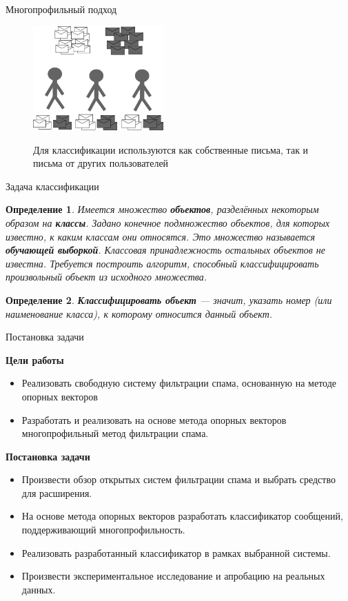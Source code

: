 \documentclass{beamer}
\newtheorem{define}{Определение}
\begin{document}
\begin{frame}{Многопрофильный подход}
\begin{figure}[h]
\begin{center}
    \includegraphics[width=5cm]{img/multiprofile}
\end{center}
    Для классификации используются как собственные письма, так и письма от других пользователей
\end{figure}
\end{frame}

\begin{frame}{Задача классификации}
\begin{define}
Имеется множество \textbf{объектов}, разделённых некоторым образом на \textbf{классы}. Задано конечное подмножество объектов, для которых известно, к каким классам они относятся. Это множество называется \textbf{обучающей выборкой}. Классовая принадлежность остальных объектов не известна. Требуется построить алгоритм, способный классифицировать произвольный объект из исходного множества. 
\end{define}
\begin{define}
\textbf{Классифицировать объект} — значит, указать номер (или наименование класса), к которому относится данный объект. 
\end{define}
\end{frame}

\begin{frame}{Постановка задачи}

\textbf{Цели работы}

\begin{itemize}
\item Реализовать свободную систему фильтрации спама, основанную на методе опорных векторов
\item Разработать и реализовать на основе метода опорных векторов многопрофильный метод фильтрации спама.
\end{itemize}

\textbf {Постановка задачи}

\begin{itemize}
	\item Произвести обзор открытых систем фильтрации спама и выбрать средство для расширения.
    \item На основе метода опорных векторов разработать классификатор сообщений, поддерживающий многопрофильность.
	\item Реализовать разработанный классификатор  в рамках выбранной системы.
    \item Произвести экспериментальное исследование и апробацию на реальных данных.
\end{itemize}
\end{frame}
\end{document}
